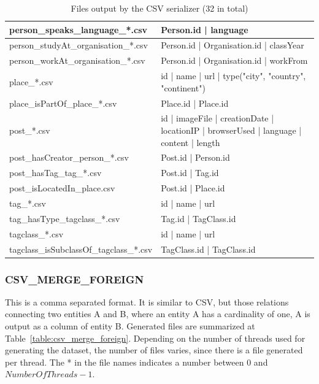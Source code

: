 \begin{table}[htbp]
\begin{tabular}{|p{4.6cm}|p{9.8cm}|}
        \hline
        person\_speaks\_language\_*.csv & Person.id | language \\
        \hline
        person\_studyAt\_organisation\_*.csv & Person.id | Organisation.id | classYear \\
        \hline
        person\_workAt\_organisation\_*.csv &  Person.id | Organisation.id | workFrom \\
        \hline
        place\_*.csv & id | name | url | type({"city", "country", "continent"}) \\
        \hline
        place\_isPartOf\_place\_*.csv & Place.id | Place.id \\
        \hline
        post\_*.csv & id | imageFile | creationDate | locationIP | browserUsed | language | content | length \\
        \hline
        post\_hasCreator\_person\_*.csv & Post.id | Person.id \\
        \hline
        post\_hasTag\_tag\_*.csv & Post.id | Tag.id \\
        \hline
        post\_isLocatedIn\_place.csv & Post.id | Place.id \\
        \hline
        tag\_*.csv & id | name | url \\
        \hline
        tag\_hasType\_tagclass\_*.csv & Tag.id | TagClass.id \\
        \hline
        tagclass\_*.csv & id | name | url \\
        \hline
        tagclass\_isSubclassOf\_tagclass\_*.csv & TagClass.id | TagClass.id \\
        \hline
    \end{tabular}
    \caption{Files output by the CSV serializer (32 in total)}
    \label{table:csv}
\end{table}




\subsubsection{CSV\_MERGE\_FOREIGN}

This is a comma separated format. It is similar to CSV, but those relations
connecting two entities A and B, where an entity A has a cardinality of one, A
is output as a column of entity B. Generated files are summarized at
Table~\ref{table:csv_merge_foreign}. Depending on the number of threads used for generating
the dataset, the number of files varies, since there is a file generated per
thread. The * in the file names indicates a number between 0 and $\mathit{NumberOfThreads}-1$.

